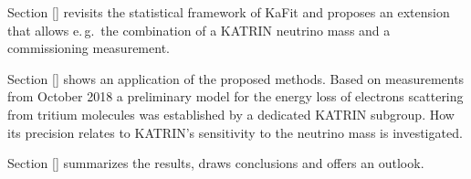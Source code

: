 Section \ref{} revisits the statistical framework of KaFit and proposes an extension that allows e.\,g.~the combination of a KATRIN neutrino mass and a commissioning measurement.

Section \ref{} shows an application of the proposed methods. Based on measurements from October 2018 a preliminary model for the energy loss of electrons scattering from tritium molecules was established by a dedicated KATRIN subgroup. How its precision relates to KATRIN's sensitivity to the neutrino mass is investigated.

Section \ref{} summarizes the results, draws conclusions and offers an outlook.